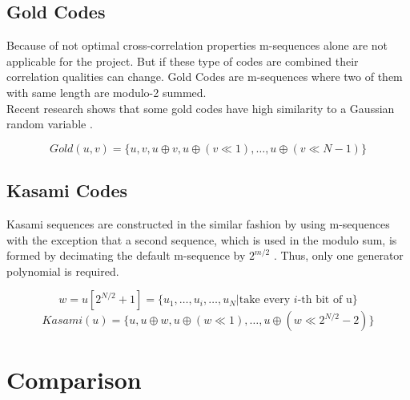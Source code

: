 
\subsection{Gold Codes}

Because of not optimal cross-correlation properties m-sequences alone are not applicable for the project. But if these type of codes are combined their correlation qualities can change. Gold Codes are m-sequences where two of them with same length are modulo-2 summed. \cite{proakis08} \\
Recent research shows that some gold codes have high similarity to a Gaussian random variable \cite{merrifield}. 

\begin{equation}
Gold(u,v)=\{u,v,u\oplus v,u\oplus(v \ll1),\dots,u\oplus(v\ll N-1)\}
\end{equation}


\subsection{Kasami Codes}

Kasami sequences are constructed in the similar fashion by using m-sequences with the exception that a second sequence, which is used in the modulo sum, is formed by decimating the default m-sequence by  $2^{m/2}$ \cite{proakis08} \cite{sarwate80} \cite{peterson72}. Thus, only one generator polynomial is required.

\begin{equation}
w=u[2^{N/2}+1]=\{u_1,\dots, u_i, \dots,u_{N}|\text{take every }i\text{-th bit of u}\} 
\end{equation}
\begin{equation}
Kasami(u)=\{u,u\oplus w,u\oplus(w \ll1),\dots,u\oplus(w\ll2^{N/2}-2)\}
\end{equation}


\section{Comparison}



